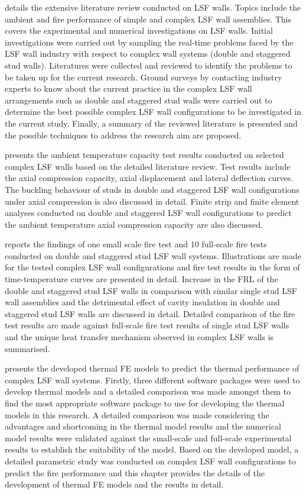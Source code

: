 \textbf{} details the extensive literature review conducted on LSF walls. Topics include the ambient and fire performance of simple and complex LSF wall assemblies. This covers the experimental and numerical investigations on LSF walls. Initial investigations were carried out by sampling the real-time problems faced by the LSF wall industry with respect to complex wall systems (double and staggered stud walls). Literatures were collected and reviewed to identify the problems to be taken up for the current research. Ground surveys by contacting industry experts to know about the current practice in the complex LSF wall arrangements such as double and staggered stud walls were carried out to determine the best possible complex LSF wall configurations to be investigated in the current study. Finally, a summary of the reviewed literature is presented and the possible techniques to address the research aim are proposed.

\textbf{} presents the ambient temperature capacity test results conducted on selected complex LSF walls based on the detailed literature review. Test results include the axial compression capacity, axial displacement and lateral deflection curves. The buckling behaviour of studs in double and staggered LSF wall configurations under axial compression is also discussed in detail. Finite strip and finite element analyses conducted on double and staggered LSF wall configurations to predict the ambient temperature axial compression capacity are also discussed. 

\textbf{} reports the findings of one small scale fire test and 10 full-scale fire tests conducted on double and staggered stud LSF wall systems. Illustrations are made for the tested complex LSF wall configurations and fire test results in the form of time-temperature curves are presented in detail. Increase in the FRL of the double and staggered stud LSF walls in comparison with similar single stud LSF wall assemblies and the detrimental effect of cavity insulation in double and staggered stud LSF walls are discussed in detail. Detailed comparison of the fire test results are made against full-scale fire test results of single stud LSF walls and the unique heat transfer mechanism observed in complex LSF walls is summarised. 

\textbf{} presents the developed thermal FE models to predict the thermal performance of complex LSF wall systems. Firstly, three different software packages were used to develop thermal models and a detailed comparison was made amongst them to find the most appropriate software package to use for developing the thermal models in this research. A detailed comparison was made considering the advantages and shortcoming in the thermal model results and the numerical model results were validated against the small-scale and full-scale experimental results to establish the suitability of the model. Based on the developed model, a detailed parametric study was conducted on complex LSF wall configurations to predict the fire performance and this chapter provides the details of the development of thermal FE models and the results in detail.

